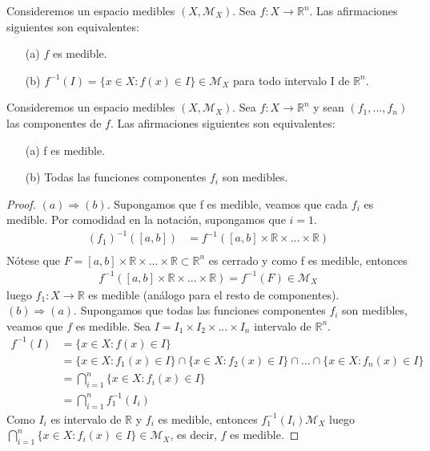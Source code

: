 \begin{prop}
 Consideremos un espacio medibles $(X, \mathcal{M}_X)$. Sea $f : X \longrightarrow \mathbb{R}^n$. Las afirmaciones siguientes son equivalentes:
 \begin{enumerate}
     \item[(a)] $f$ es medible.
     \item[(b)] $f^{-1}(I) = \{ x \in X : f(x) \in I\} \in \mathcal{M}_X$ para todo intervalo I de $\mathbb{R}^n$.
  \end{enumerate}
\end{prop}

\begin{prop}
Consideremos un espacio medibles $(X, \mathcal{M}_X)$. Sea $f : X \longrightarrow \mathbb{R}^n$ y sean $(f_1, ..., f_n)$ las componentes de  $f$. Las afirmaciones siguientes son equivalentes:
\begin{enumerate}
    \item[(a)] f es medible.
    \item[(b)] Todas las funciones componentes $f_i$ son medibles.
\end{enumerate}
\end{prop}

\begin{proof}
$(a) \Longrightarrow (b)$. Supongamos que f es medible, veamos que cada $f_i$ es medible. Por comodidad en la notación, supongamos que $i = 1$.
\begin{align*}
    (f_1)^{-1}([a,b]) &= f^{-1}([a,b] \times \mathbb{R} \times ... \times \mathbb{R})\\
\end{align*}
Nótese que $F = [a,b] \times \mathbb{R} \times ... \times \mathbb{R} \subset \mathbb{R}^n$ es cerrado y como f es medible, entonces 
\begin{align*}
    f^{-1}([a,b] \times \mathbb{R} \times ... \times \mathbb{R}) = f^{-1}(F) \in \mathcal{M}_X
\end{align*}
luego $f_1: X \longrightarrow \mathbb{R}$ es medible (análogo para el resto de componentes).
\\
\newline
$(b) \Longrightarrow (a)$. Supongamos que todas las funciones componentes $f_i$ son medibles, veamos que $f$ es medible. Sea $I = I_1 \times I_2 \times ... \times I_n$ intervalo de $\mathbb{R}^n$.
\begin{align*}
    f^{-1}(I) &= \{ x \in X : f(x) \in I\}\\
    &= \{ x \in X : f_1(x) \in I\} \cap \{ x \in X : f_2(x) \in I\} \cap ... \cap \{ x \in X : f_n(x) \in I\}\\
    &= \bigcap_{i=1}^{n}{\{ x \in X : f_i(x) \in I\}}\\
    &= \bigcap_{i=1}^{n}{f_{1}^{-1}(I_i)}
\end{align*}
Como $I_i$ es intervalo de $\mathbb{R}$ y $f_i$ es medible, entonces $f_{1}^{-1}(I_i) \mathcal{M}_X$ luego $\bigcap_{i=1}^{n}{\{ x \in X : f_i(x) \in I\}} \in \mathcal{M}_X$, es decir, $f$ es medible.
\end{proof}

